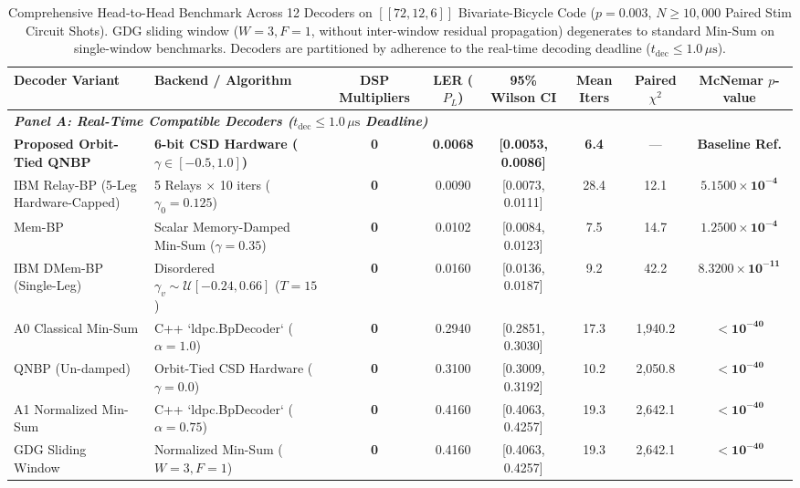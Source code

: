 \begin{table}[t]
\caption{Comprehensive Head-to-Head Benchmark Across 12 Decoders on $[[72,12,6]]$ Bivariate-Bicycle Code ($p = 0.003$, $N \ge 10,000$ Paired Stim Circuit Shots). GDG sliding window ($W=3, F=1$, without inter-window residual propagation) degenerates to standard Min-Sum on single-window benchmarks. Decoders are partitioned by adherence to the real-time decoding deadline ($t_{\text{dec}} \le 1.0\,\mu\text{s}$).}
\label{tab:competitors}
\centering
\begin{tabular}{llcccccc}
\toprule
\textbf{Decoder Variant} & \textbf{Backend / Algorithm} & \textbf{DSP Multipliers} & \textbf{LER ($P_L$)} & \textbf{95\% Wilson CI} & \textbf{Mean Iters} & \textbf{Paired $\chi^2$} & \textbf{McNemar $p$-value} \\
\midrule
\multicolumn{8}{l}{\textit{\textbf{Panel A: Real-Time Compatible Decoders ($t_{\text{dec}} \le 1.0\,\mu\text{s}$ Deadline)}}} \\
\midrule
\textbf{Proposed Orbit-Tied QNBP} & \textbf{6-bit CSD Hardware ($\gamma \in [-0.5, 1.0]$)} & \textbf{0} & \textbf{0.0068} & \textbf{[0.0053, 0.0086]} & \textbf{6.4} & --- & \textbf{Baseline Ref.} \\
IBM Relay-BP (5-Leg Hardware-Capped)~\cite{muller2025relay} & 5 Relays $\times$ 10 iters ($\gamma_0=0.125$) & \textbf{0} & 0.0090 & [0.0073, 0.0111] & 28.4 & 12.1 & $\mathbf{5.1500\times 10^{-4}}$ \\
Mem-BP~\cite{chytas2025enhanced} & Scalar Memory-Damped Min-Sum ($\gamma=0.35$) & \textbf{0} & 0.0102 & [0.0084, 0.0123] & 7.5 & 14.7 & $\mathbf{1.2500\times 10^{-4}}$ \\
IBM DMem-BP (Single-Leg)~\cite{muller2025relay} & Disordered $\gamma_v \sim \mathcal{U}[-0.24, 0.66]$ ($T=15$) & \textbf{0} & 0.0160 & [0.0136, 0.0187] & 9.2 & 42.2 & $\mathbf{8.3200\times 10^{-11}}$ \\
A0 Classical Min-Sum & C++ `ldpc.BpDecoder` ($\alpha=1.0$) & \textbf{0} & 0.2940 & [0.2851, 0.3030] & 17.3 & 1,940.2 & $\mathbf{< 10^{-40}}$ \\
QNBP (Un-damped) & Orbit-Tied CSD Hardware ($\gamma=0.0$) & \textbf{0} & 0.3100 & [0.3009, 0.3192] & 10.2 & 2,050.8 & $\mathbf{< 10^{-40}}$ \\
A1 Normalized Min-Sum & C++ `ldpc.BpDecoder` ($\alpha=0.75$) & \textbf{0} & 0.4160 & [0.4063, 0.4257] & 19.3 & 2,642.1 & $\mathbf{< 10^{-40}}$ \\
GDG Sliding Window~\cite{gong2024sliding} & Normalized Min-Sum ($W=3, F=1$) & \textbf{0} & 0.4160 & [0.4063, 0.4257] & 19.3 & 2,642.1 & $\mathbf{< 10^{-40}}$ \\

\end{tabular}
\end{table}
